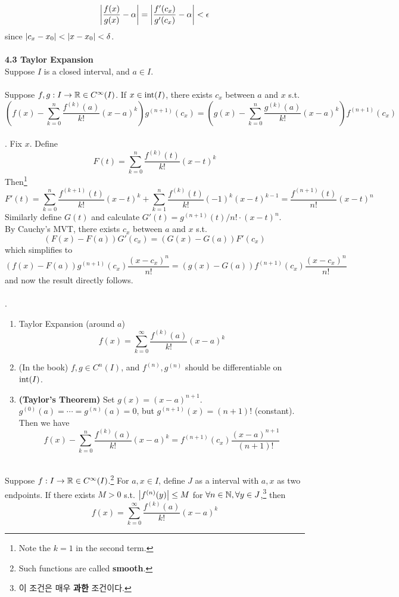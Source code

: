 $$\left|\frac{f(x)}{g(x)} - \alpha\right| = \left|\frac{f'(c_x)}{g'(c_x)} - \alpha\right| < \epsilon$$
since $\left|c_x - x_0\right| < \left|x - x_0\right| < \delta$.\\
\\
\textbf{4.3 Taylor Expansion}\\
Suppose $I$ is a closed interval, and $a\in I$.\\
\\
 Suppose $f, g:I\rightarrow \mathbb{R} \in C^\infty(I)$. If $x\in \mathrm{int} (I)$, there exists $c_x$ between $a$ and $x$ s.t. $$ \left(f(x) - \sum_{k =0}^n \frac{f^{(k)}(a)}{k!}(x-a)^k\right)g^{(n+1)}(c_x) = \left(g(x) - \sum_{k =0}^n \frac{g^{(k)}(a)}{k!}(x-a)^k\right)f^{(n+1)}(c_x)$$
\\
\pf. Fix $x$. Define $$F(t) = \sum_{k =0}^n \frac{f^{(k)}(t)}{k!}(x-t)^k$$
Then\footnote{Note the $k=1$ in the second term.} $$F'(t) = \sum_{k =0}^n \frac{f^{(k+1)}(t)}{k!}(x-t)^k + \sum_{k =1}^n \frac{f^{(k)}(t)}{k!}(-1)^k(x-t)^{k-1} = \frac{f^{(n+1)}(t)}{n!}(x-t)^n$$
Similarly define $G(t)$ and calculate $G'(t) = g^{(n+1)}(t) / n! \cdot (x-t)^n$.\\
By Cauchy's MVT, there exists $c_x$ between $a$ and $x$ s.t. $$(F(x) - F(a))G'(c_x) = (G(x) - G(a))F'(c_x)$$
which simplifies to $$(f(x) - F(a))g^{(n+1)}(c_x)\frac{(x-c_x)^n}{n!} = (g(x) - G(a))f^{(n+1)}(c_x)\frac{(x-c_x)^n}{n!}$$
and now the result directly follows.\\
\\
\rmk.
\begin{enumerate}
	\item Taylor Expansion (around $a$)
	$$f(x) = \sum_{k=0}^\infty \frac{f^{(k)}(a)}{k!}(x-a)^k$$
	\item (In the book) $f, g \in C^n(I)$, and $f^{(n)}, g^{(n)}$ should be differentiable on $\mathrm{int}(I)$. 
	\item \textbf{(Taylor's Theorem)} Set $g(x) = (x-a)^{n+1}$. $g^{(0)}(a) = \cdots = g^{(n)}(a) =0$, but $g^{(n+1)}(x) = (n+1)! $ (constant). Then we have 
	$$f(x) - \sum_{k =0}^n \frac{f^{(k)}(a)}{k!}(x-a)^k = f^{(n+1)}(c_x) \frac{(x-a)^{n+1}}{(n+1)!}$$
\end{enumerate}~\\
 Suppose $f:I\rightarrow \mathbb{R} \in C^{\infty}(I)$.\footnote{Such functions are called \textbf{smooth}.} For $a, x\in I$, define $J$ as a interval with $a, x$ as two endpoints. If there exists $M > 0$ s.t. $\left|f^{(n)}(y)\right| \leq M$ for $\forall n\in \mathbb{N}, \forall y\in J$,\footnote{이 조건은 매우 \textbf{과한} 조건이다.} then $$f(x) = \sum_{k=0}^\infty \frac{f^{(k)}(a)}{k!}(x-a)^k$$
